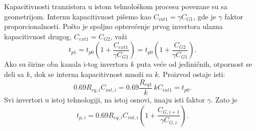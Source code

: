 Kapacitivnosti tranzistora u istom tehnološkom procesu povezane su sa geometrijom. Internu kapacitivnost pišemo kao $C_{int1}=\gamma C_{G1}$, gde je $\gamma$ faktor proporcionalnosti. Pošto je spoljno opterećenje prvog invertora ulazna kapacitivnost drugog, $C_{ext1}=C_{G2}$, važi
\[t_{p1}=t_{p0}\left(1+\frac{C_{ext1}}{\gamma C_{G1}}\right)
=t_{p0}\left(1+\frac{C_{G2}}{\gamma C_{G1}}\right).
\]
Ako su širine oba kanala i-tog invertora $k$ puta veće od jediničnih, otpornost se deli sa $k$, dok se interna kapacitivnost množi sa $k$. Proizvod ostaje isti:
\[0.69R_{eq,i}C_{int,i}=0.69\frac{R_{eq1}}k\,kC_{int1}=t_{p0}.
\]
Svi invertori u istoj tehnologiji, na istoj osnovi, imaju isti faktor $\gamma$. Zato je
\[t_{p,i}=0.69R_{eq,i}C_{int,i}\left(1+\frac{C_{G,i+1}}{\gamma C_{G,i}}\right).
\]
